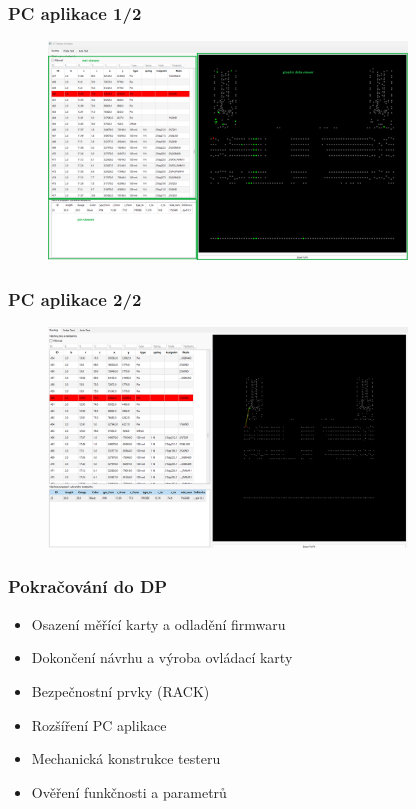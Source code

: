 \documentclass[%
  12pt,       				%
	t,                  %
	aspectratio=1610,   %
	unicode,						%
]{beamer}				    	%
\begin{document}
\begin{frame} 
	\frametitle{PC aplikace 1/2}

	\begin{figure}[ht!]
		\centering
		\includegraphics[width = 0.85\textwidth]{obrazky/PC_AP_top_view.png}
	\end{figure}
\end{frame}

\begin{frame} 
	\frametitle{PC aplikace 2/2}

	\begin{figure}[ht!]
		\centering
		\includegraphics[width = 0.85\textwidth]{obrazky/PC_AP_top_only1.png}
	\end{figure}
\end{frame}

\begin{frame} 
	\frametitle{Pokračování do DP}
	\vspace*{0.5cm}
	\begin{itemize}
		\item Osazení měřící karty a odladění firmwaru
		\item Dokončení návrhu a výroba ovládací karty
		\item Bezpečnostní prvky (RACK)
		\item Rozšíření PC aplikace
		\item Mechanická konstrukce testeru
		\item Ověření funkčnosti a parametrů
	\end{itemize}
\end{frame}
\end{document}
